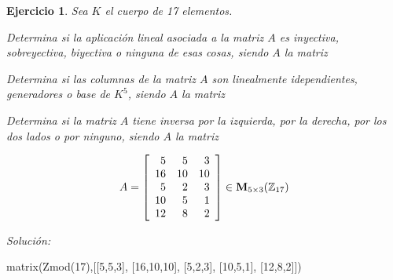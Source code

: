 \documentclass[12pt]{amsart}
\newtheorem{ejer}{Ejercicio}
\begin{document}
\begin{ejer} Sea $K$ el cuerpo de 17 elementos.
\newline
\noindent\begin{minipage}{\textwidth}
\begin{tcolorbox}[colback = green!20!white,title=Versión Aplicaciones]
Determina si la aplicaci\'on lineal asociada a la matriz $A$ es inyectiva, sobreyectiva, biyectiva o ninguna de esas cosas, siendo $A$ la matriz \end{tcolorbox}
\end{minipage} \newline
\noindent\begin{minipage}{\textwidth}
\begin{tcolorbox}[colback = blue!20!white,title=Versión Vectores]
Determina si las columnas de la matriz $A$ son linealmente idependientes, generadores o base de $K^{5}$, siendo $A$ la matriz \end{tcolorbox}
\end{minipage} \newline
\noindent\begin{minipage}{\textwidth} 
\begin{tcolorbox}[colback = red!20!white,title=Versión Inversas]
Determina si la matriz $A$ tiene inversa por la izquierda, por la derecha, por los dos lados o por ninguno, siendo $A$ la matriz 
\end{tcolorbox}
\end{minipage}
\[ A = \left[\begin{array}{rrr}
5 & 5 & 3 \\
16 & 10 & 10 \\
5 & 2 & 3 \\
10 & 5 & 1 \\
12 & 8 & 2
\end{array}\right] \in {\bf M}_{5\times 3}({\mathbb Z}_{17})\]
\end{ejer}

{\it Soluci\'on:}

\begin{sageblock}
matrix(Zmod(17),[[5,5,3],
[16,10,10],
[5,2,3],
[10,5,1],
[12,8,2]])
\end{sageblock}

\end{document}
